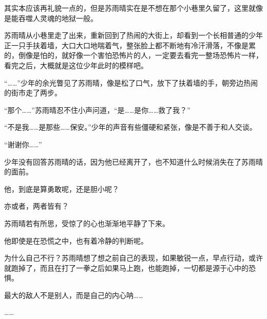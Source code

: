 其实本应该再礼貌一点的，但是苏雨晴实在是不想在那个小巷里久留了，这里就像是能吞噬人灵魂的地狱一般。

苏雨晴从小巷里走了出来，重新回到了热闹的大街上，却看到一个长相普通的少年正一只手扶着墙，大口大口地喘着气，整张脸上都不断地有冷汗滑落，不像是累的，倒像是怕的，就好像一个害怕恐怖片的人，一定要去看完一整场恐怖片一样，看完之后，大概就是这位少年此时的模样吧。

“……”少年的余光瞥见了苏雨晴，像是松了口气，放下了扶着墙的手，朝旁边热闹的街市走了两步。

“那个……”苏雨晴忍不住小声问道，“是……是你……救了我？”

“不是我……是那些……保安。”少年的声音有些僵硬和紧张，像是不善于和人交谈。

“谢谢你……”

少年没有回答苏雨晴的话，因为他已经离开了，也不知道什么时候消失在了苏雨晴的面前。

他，到底是算勇敢呢，还是胆小呢？

亦或者，两者皆有？

苏雨晴若有所思，受惊了的心也渐渐地平静了下来。

他即使是在恐慌之中，也有着冷静的判断呢。

为什么自己不行？苏雨晴想了想之前自己的表现，如果敏锐一点，早点行动，或许就跑掉了，而且在打了一拳之后如果马上跑，也能跑掉，一切都是源于心中的恐惧。

最大的敌人不是别人，而是自己的内心呐……

……
